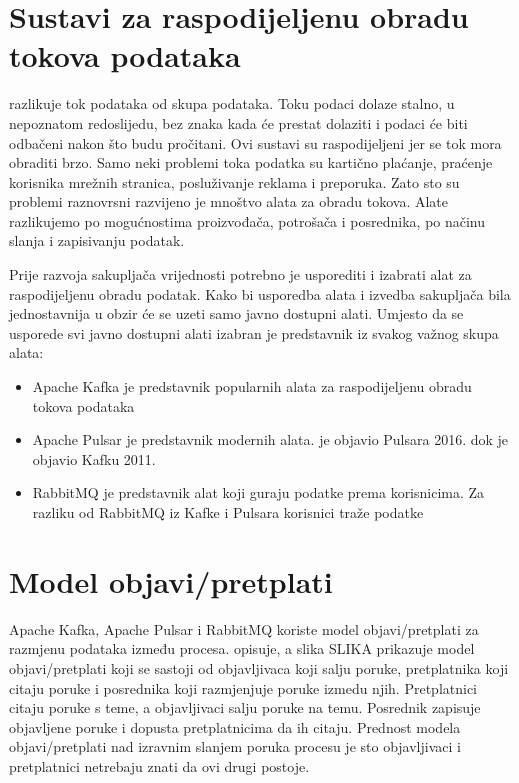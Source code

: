\documentclass[times, utf8, diplomski, numeric]{fer}
\begin{document}
\chapter{Sustavi za raspodijeljenu obradu tokova podataka}

\citep{ilprints535} razlikuje tok podataka od skupa podataka. Toku podaci dolaze stalno, u nepoznatom redoslijedu, bez znaka kada će prestat dolaziti i podaci će biti odbačeni nakon što budu pročitani. Ovi sustavi su raspodijeljeni jer se tok mora obraditi brzo. Samo neki problemi toka podatka su kartično plaćanje, praćenje korisnika mrežnih stranica, posluživanje reklama i preporuka. Zato sto su problemi raznovrsni razvijeno je mnoštvo alata za obradu tokova. Alate razlikujemo po mogućnostima proizvođača, potrošača i posrednika, po načinu slanja i zapisivanju podatak.

Prije razvoja sakupljača vrijednosti potrebno je usporediti i izabrati alat za raspodijeljenu obradu podatak. Kako bi usporedba alata i izvedba sakupljača bila jednostavnija u obzir će se uzeti samo javno dostupni alati. Umjesto da se usporede svi javno dostupni alati izabran je predstavnik iz svakog važnog skupa alata:
\begin{itemize}
  \item Apache Kafka je predstavnik popularnih alata za raspodijeljenu obradu tokova podataka
  \item Apache Pulsar je predstavnik modernih alata. \citep{yahoo-blogpost} je objavio Pulsara 2016. dok je \citep{kafka-whitepaper} objavio Kafku 2011.
  \item RabbitMQ je predstavnik alat koji guraju podatke prema korisnicima. Za razliku od RabbitMQ iz Kafke i Pulsara korisnici traže podatke
\end{itemize}

\chapter{Model objavi/pretplati}
Apache Kafka, Apache Pulsar i RabbitMQ koriste model objavi/pretplati za razmjenu podataka između procesa. \citep{rassus-manual} opisuje, a slika SLIKA prikazuje model objavi/pretplati koji se sastoji od objavljivaca koji salju poruke, pretplatnika koji citaju poruke i posrednika koji razmjenjuje poruke izmedu njih. Pretplatnici citaju poruke s teme, a objavljivaci salju poruke na temu. Posrednik zapisuje objavljene poruke i dopusta pretplatnicima da ih citaju. Prednost modela objavi/pretplati nad izravnim slanjem poruka procesu je sto objavljivaci i pretplatnici netrebaju znati da ovi drugi postoje. 
\end{document}

